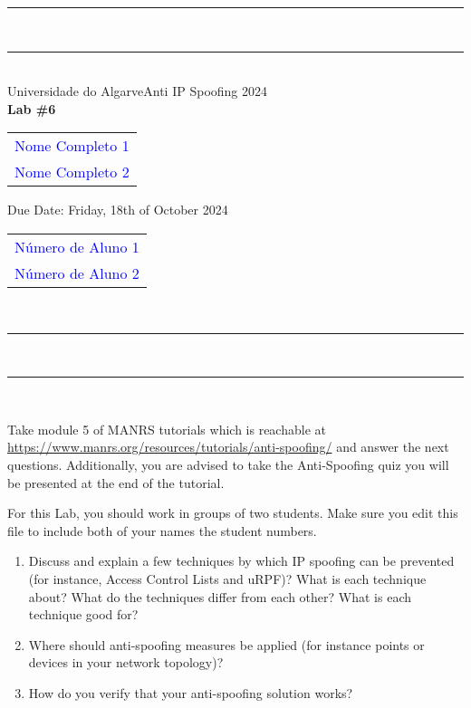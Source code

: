 \documentclass{article} %
\begin{document}
\begin{center}
\rule{\textwidth}{.0075in} \\
\rule[3mm]{\textwidth}{.0075in}\\

Universidade do Algarve\hfill Anti IP Spoofing \hfill 2024\\[3ex]

{\Large\bf Lab \#6} \\[3ex]

\begin{tabular}{l}
\textcolor{blue}{Nome Completo 1} \\ \hfill 
\textcolor{blue}{Nome Completo 2} \hfill
\end{tabular}
 Due Date: Friday, 18th of October 2024 \hfill 
\begin{tabular}{l}
\textcolor{blue}{Número de Aluno 1} \\ \hfill 
\textcolor{blue}{Número de Aluno 2} \hfill
\end{tabular}\\

\rule{\textwidth}{.0075in} \\
\rule[3mm]{\textwidth}{.0075in} \\
\end{center}


Take module 5 of MANRS tutorials which is reachable at
\href{https://www.manrs.org/resources/tutorials/anti-spoofing/}{https://\-www.manrs.org/\-resources/\-tutorials/\-anti-\-spoofing/}
and answer the next questions. Additionally, you are advised to take the Anti-Spoofing quiz you
will be presented at the end of the tutorial.

For this Lab, you should work in groups of two students. Make sure you edit this file to include
both of your names the student numbers.


\begin{enumerate}
\item Discuss and explain a few techniques by which IP spoofing can be prevented (for instance,
  Access Control Lists and uRPF)? What is each technique about? What do the techniques differ from
  each other? What is each technique good for?
\item Where should anti-spoofing measures be applied
  (for instance points or devices in your network topology)?
\item How do you verify that your anti-spoofing solution works?
\end{enumerate}  
\end{document}
